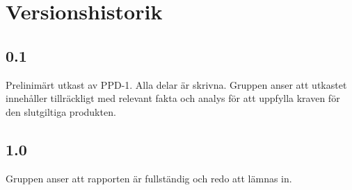 \section*{Versionshistorik}

\subsection*{0.1}
Prelinimärt utkast av PPD-1. Alla delar är skrivna. Gruppen anser att utkastet innehåller tillräckligt med relevant fakta och analys för att uppfylla kraven för den slutgiltiga produkten. 

\subsection*{1.0}
Gruppen anser att rapporten är fullständig och redo att lämnas in.
